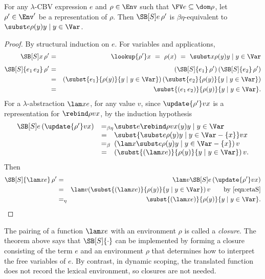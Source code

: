 \begin{theorem}
For any $\lambda$-CBV expression $e$ and $\rho\in\Env$ such that $\FV e\subseteq\dom\rho$, let $\rho'\in\Env'$ be a representation of
$\rho$.  Then $\SB[S]e\,\rho'$ is $\beta\eta$-equivalent to $\subst e{\rho(y)}{y \mid y\in\Var}$.
\end{theorem}
\begin{proof}
By structural induction on $e$.  For variables and applications,
\begin{eqnarray*}
\SB[S] x\,\rho' &=& \lookup{\rho'}x\ =\ \rho(x)\ =\ \subst x{\rho(y)}{y \mid y\in\Var}\\[1ex]
\SB[S]{e_1\,e_2}\,\rho' &=& (\SB[S]{e_1}\,\rho')\,(\SB[S]{e_2}\,\rho')\\
&=& (\subst{e_1}{\rho(y)}{y\mid y\in\Var})\,(\subst{e_2}{\rho(y)}{y \mid y\in\Var})\\
&=& \subst{(e_1\,e_2)}{\rho(y)}{y \mid y\in\Var}.
\end{eqnarray*}
For a $\lambda$-abstraction $\lam xe$, for any value $v$,
since $\update{\rho'}vx$ is a representation for $\rebind\rho vx$,
by the induction hypothesis
\begin{equation}
\begin{array}{rcl}
\SB[S] e\,(\update{\rho'}vx)
&=_{\lefteqn{\scriptstyle\beta\eta}}& \subst e{\rebind\rho vx(y)}{y \mid y\in\Var}\\
&=& \subst{\subst e{\rho(y)}{y \mid y\in\Var-\{x\}}}vx\\
&=_{\lefteqn{\scriptstyle\beta}}& (\lam x{\subst e{\rho(y)}{y \mid y\in\Var-\{x\}}})\,v\\
&=& (\subst{(\lam xe)}{\rho(y)}{y \mid y\in\Var})\,v.
\end{array}
\label{eqn:etaS}
\end{equation}
Then
\begin{eqnarray*}
\SB[S]{\lam xe}\,\rho'
&=& \lam v{\SB[S] e\,(\update{\rho'}vx)}\\
&=& \lam v{(\subst{(\lam xe)}{\rho(y)}{y \mid y\in\Var})\,v}\qquad\text{by \eqref{eqn:etaS}}\\
&=_{\lefteqn{\scriptstyle\eta}}& \subst{(\lam xe)}{\rho(y)}{y \mid y\in\Var}.
\end{eqnarray*}
\end{proof}

The pairing of a function $\lam xe$ with an environment $\rho$ is
called a \emph{closure}.  The theorem above says that $\SB[S]{\cdot}$
can be implemented by forming a closure consisting of the term $e$ and
an environment $\rho$ that determines how to interpret the free
variables of $e$.  By contrast, in dynamic scoping, the translated
function does not record the lexical environment, so closures are not
needed.
